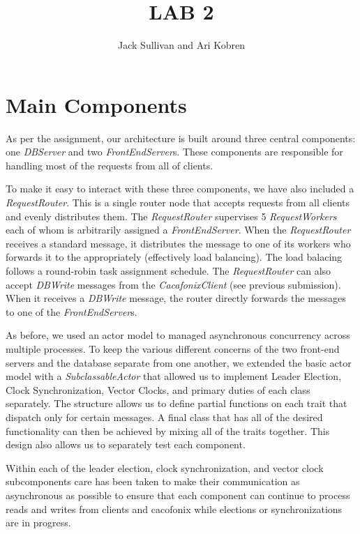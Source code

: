 \documentclass[11pt]{article}
\begin{document}
\title{LAB 2}
\author{Jack Sullivan and Ari Kobren}
\maketitle

\section{Main Components}
As per the assignment, our architecture is built around three central
components: one \emph{DBServer} and two \emph{FrontEndServer}s. These
components are responsible for handling most of the requests from all
of clients.

To make it easy to interact with these three components, we have also
included a \emph{RequestRouter}.  This is a single router node that
accepts requests from all clients and evenly distributes them. The
\emph{RequestRouter} supervises 5 \emph{RequestWorkers} each of whom
is arbitrarily assigned a \emph{FrontEndServer}. When the
\emph{RequestRouter} receives a standard message, it distributes the
message to one of its workers who forwards it to the appropriately
(effectively load balancing). The load balacing follows a round-robin
task assignment schedule.  The \emph{RequestRouter} can also accept
\emph{DBWrite} messages from the \emph{CacafonixClient} (see previous
submission).  When it receives a \emph{DBWrite} message, the router
directly forwards the messages to one of the \emph{FrontEndServer}s.

As before, we used an actor model to managed asynchronous concurrency across multiple processes. To keep the various different concerns of the two front-end servers and the database separate from one another, we extended the basic actor model with a \emph{SubclassableActor} that allowed us to implement Leader Election, Clock Synchronization, Vector Clocks, and primary duties of each class separately. The structure allows us to define partial functions on each trait that dispatch only for certain messages. A final class that has all of the desired functionality can then be achieved by mixing all of the traits together. This design also allows us to separately test each component.

Within each of the leader election, clock synchronization, and vector clock subcomponents care has been taken to make their communication as asynchronous as possible to ensure that each component can continue to process reads and writes from clients and cacofonix while elections or synchronizations are in progress.
\end{document}

